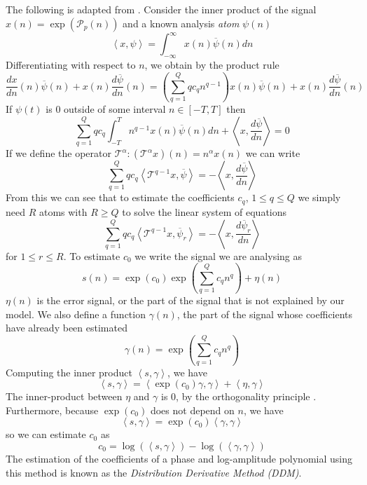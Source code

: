 The following is adapted from \cite{betser2009sinusoidal}. Consider the inner
product of the signal $x(n) = \exp(\mathcal{P}_p(n)) $ and a
known analysis \textit{atom} $\psi(n)$
\[
    \left\langle x,\psi \right\rangle =
    \int_{-\infty}^{\infty}x(n)\overline{\psi}(n)dn
\]
Differentiating with respect to $n$, we obtain by the product rule
\[
    \frac{dx}{dn}(n)\overline{\psi}(n)
    + x(n)\frac{d\overline{\psi}}{dn}(n)
    = \left( \sum_{q=1}^{Q} q c_q n^{q-1} \right) x(n)\overline{\psi}(n)
    + x(n)\frac{d\overline{\psi}}{dn}(n)
\]
If $\psi(t)$ is 0 outside of some interval $n \in [-T,T]$ then
\[
    \sum_{q=1}^{Q} q c_q \int_{-T}^{T} n^{q-1} x(n) \overline{\psi}(n) dn
    + \left\langle x, \frac{d\overline{\psi}}{dn} \right\rangle = 0
\]
If we define the operator $\mathcal{T}^{\alpha} : (\mathcal{T}^{\alpha}x)(n) =
n^{\alpha}x(n)$ we can write
\[ 
    \sum_{q=1}^{Q} q c_q 
    \left\langle \mathcal{T}^{q-1} x , \overline{\psi} \right\rangle
    = -\left\langle x, \frac{d\overline{\psi}}{dn} \right\rangle
\]
From this we can see that to estimate the coefficients $c_q$, $ 1 \leq q \leq Q
$ we simply need $R$ atoms with $R \geq Q$ to solve the linear system of
equations
\begin{equation}
    \label{eq:ddmsyseq}
    \sum_{q=1}^{Q} q c_q 
    \left\langle \mathcal{T}^{q-1} x , \overline{\psi}_{r} \right\rangle
    = -\left\langle x, \frac{d\overline{\psi}_{r}}{dn} \right\rangle
\end{equation}
for $1 \leq r \leq R$. To estimate $c_0$ we write the signal we are analysing as
\[
    s(n) = \exp(c_0) \exp \left( \sum_{q=1}^{Q} c_q n^{q} \right) + \eta (n)
\]
$\eta (n)$ is the error signal, or the part of the signal that is not explained
by our model. We also define a function $\gamma (n)$, the part of the signal
whose coefficients have already been estimated
\[
    \gamma(n) = \exp \left( \sum_{q=1}^{Q} c_q n^{q} \right)
\]
Computing the inner product $\left\langle s , \gamma \right\rangle$, we have
\[
    \left\langle s , \gamma \right\rangle
    =
    \left\langle \exp(c_0) \gamma , \gamma \right\rangle + 
        \left\langle \eta , \gamma \right\rangle
\]
The inner-product between $\eta$ and $\gamma$ is $0$, by the orthogonality
principle \cite[ch.~12]{kay1993fundamentals}. Furthermore, because $\exp(c_0)$ does not
depend on $n$, we have
\[
    \left\langle s , \gamma \right\rangle
    =
    \exp(c_0) \left\langle \gamma , \gamma \right\rangle
\]
so we can estimate $c_0$ as
\begin{equation}
    \label{eq:ddmestc0}
    c_0 = \log \left( \left\langle s , \gamma \right\rangle \right)
        - \log \left( \left\langle \gamma , \gamma \right\rangle \right)
\end{equation}
The estimation of the coefficients of a phase and log-amplitude polynomial
using this method is known as the \textit{Distribution Derivative Method (DDM)}.

